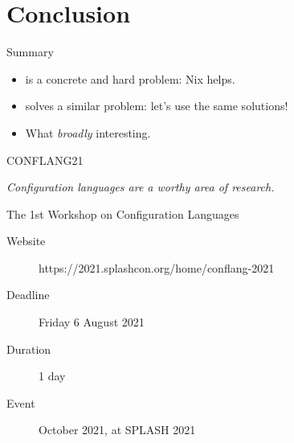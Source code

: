\documentclass[a4paper]{beamer}
\newcommand{\couleur}[2]{{\color{#1}{#2}}}
\begin{document}
\section{Conclusion}

\begin{frame}{Summary}
    \begin{itemize}
        \item \couleur{orange-vivid-tangerine}{Reproducibility} is a concrete
            and hard problem: Nix helps.
        \item \couleur{orange-vivid-tangerine}{Functional programming} solves
            a similar problem: let's use the same solutions!
        \item What
            \emph{broadly} interesting.
    \end{itemize}
\end{frame}

\begin{frame}{CONFLANG21}

    \begin{center}
        \textit{Configuration languages are a worthy area of research.}
    \end{center}

    The 1st Workshop on Configuration Languages

    \begin{description}
        \item[Website] https://2021.splashcon.org/home/conflang-2021
        \item[Deadline] Friday 6 August 2021
        \item[Duration] 1 day
        \item[Event] October 2021, at SPLASH 2021
    \end{description}
\end{frame}
\end{document}
